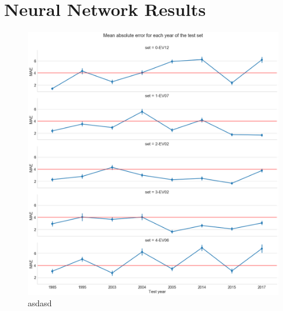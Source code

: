 \clearpage
\section{Neural Network Results}
\label{apx:nn_evaluation}

\begin{figure}[h]
  \centering
  \includegraphics[width=\linewidth]{./99_appendix/img/prediction_years_ci.png}
  \caption{asdasd}
  \label{apx:prediction_years_ci}
\end{figure}

